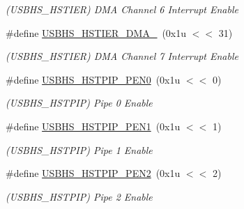 \begin{DoxyCompactItemize}
\begin{DoxyCompactList}\small\item\em (U\+S\+B\+H\+S\+\_\+\+H\+S\+T\+I\+ER) D\+MA Channel 6 Interrupt Enable \end{DoxyCompactList}\item 
\mbox{\label{group__SAMS70__USBHS_ga4c9d1366f1850d5774255cd13566cb42}} 
\#define \mbox{\hyperlink{group__SAMS70__USBHS_ga4c9d1366f1850d5774255cd13566cb42}{U\+S\+B\+H\+S\+\_\+\+H\+S\+T\+I\+E\+R\+\_\+\+D\+M\+A\+\_}}~(0x1u $<$$<$ 31)
\begin{DoxyCompactList}\small\item\em (U\+S\+B\+H\+S\+\_\+\+H\+S\+T\+I\+ER) D\+MA Channel 7 Interrupt Enable \end{DoxyCompactList}\item 
\mbox{\label{group__SAMS70__USBHS_ga7487e8a82f0ff8f8b6b69beda7cf55db}} 
\#define \mbox{\hyperlink{group__SAMS70__USBHS_ga7487e8a82f0ff8f8b6b69beda7cf55db}{U\+S\+B\+H\+S\+\_\+\+H\+S\+T\+P\+I\+P\+\_\+\+P\+E\+N0}}~(0x1u $<$$<$ 0)
\begin{DoxyCompactList}\small\item\em (U\+S\+B\+H\+S\+\_\+\+H\+S\+T\+P\+IP) Pipe 0 Enable \end{DoxyCompactList}\item 
\mbox{\label{group__SAMS70__USBHS_gaa0887f2ef0207418052909aa2358d2b1}} 
\#define \mbox{\hyperlink{group__SAMS70__USBHS_gaa0887f2ef0207418052909aa2358d2b1}{U\+S\+B\+H\+S\+\_\+\+H\+S\+T\+P\+I\+P\+\_\+\+P\+E\+N1}}~(0x1u $<$$<$ 1)
\begin{DoxyCompactList}\small\item\em (U\+S\+B\+H\+S\+\_\+\+H\+S\+T\+P\+IP) Pipe 1 Enable \end{DoxyCompactList}\item 
\mbox{\label{group__SAMS70__USBHS_ga53c05b7dbe819883dedf80eac2596828}} 
\#define \mbox{\hyperlink{group__SAMS70__USBHS_ga53c05b7dbe819883dedf80eac2596828}{U\+S\+B\+H\+S\+\_\+\+H\+S\+T\+P\+I\+P\+\_\+\+P\+E\+N2}}~(0x1u $<$$<$ 2)
\begin{DoxyCompactList}\small\item\em (U\+S\+B\+H\+S\+\_\+\+H\+S\+T\+P\+IP) Pipe 2 Enable \end{DoxyCompactList}\item 

\end{DoxyCompactItemize}
